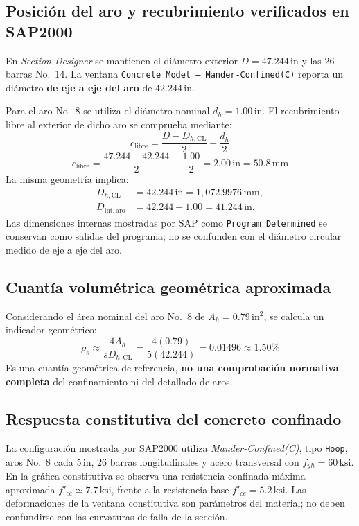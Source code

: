 \documentclass[11pt,a4paper]{article}
\begin{document}
\subsection{Posición del aro y recubrimiento verificados en SAP2000}
En \textit{Section Designer} se mantienen el diámetro exterior
$D=47.244\,\mathrm{in}$ y las $26$ barras No.~14. La ventana
\texttt{Concrete Model -- Mander-Confined(C)} reporta un diámetro
\textbf{de eje a eje del aro} de $42.244\,\mathrm{in}$.

Para el aro No.~8 se utiliza el diámetro nominal $d_h=1.00\,\mathrm{in}$.
El recubrimiento libre al exterior de dicho aro se comprueba mediante:
\begin{equation*}
c_{\mathrm{libre}}=\frac{D-D_{h,\mathrm{CL}}}{2}-\frac{d_h}{2}
\end{equation*}
\begin{equation*}
c_{\mathrm{libre}}=\frac{47.244-42.244}{2}-\frac{1.00}{2}
=\boxed{2.00\,\mathrm{in}=50.8\,\mathrm{mm}}
\end{equation*}
La misma geometría implica:
\begin{align*}
D_{h,\mathrm{CL}} &= 42.244\,\mathrm{in}=1{,}072.9976\,\mathrm{mm},\\
D_{\mathrm{int,aro}} &=42.244-1.00
=\boxed{41.244\,\mathrm{in}}.
\end{align*}
Las dimensiones internas mostradas por SAP como \texttt{Program Determined}
se conservan como salidas del programa; no se confunden con el diámetro
circular medido de eje a eje del aro.

\subsection{Cuantía volumétrica geométrica aproximada}
Considerando el área nominal del aro No.~8 de
$A_h=0.79\,\mathrm{in}^2$, se calcula un indicador geométrico:
\begin{equation*}
\rho_s\approx\frac{4A_h}{sD_{h,\mathrm{CL}}}
=\frac{4(0.79)}{5(42.244)}
=\boxed{0.01496\approx 1.50\%}
\end{equation*}
Es una cuantía geométrica de referencia, \textbf{no una comprobación
normativa completa} del confinamiento ni del detallado de aros.

\subsection{Respuesta constitutiva del concreto confinado}
La configuración mostrada por SAP2000 utiliza
\textit{Mander-Confined(C)}, tipo \texttt{Hoop}, aros No.~8
cada $5\,\mathrm{in}$, $26$ barras longitudinales y acero transversal
con $f_{yh}=60\,\mathrm{ksi}$.
En la gráfica constitutiva se observa una resistencia confinada máxima
aproximada $f'_{cc}\simeq7.7\,\mathrm{ksi}$, frente a la resistencia
base $f'_{ce}=5.2\,\mathrm{ksi}$. Las deformaciones de la ventana
constitutiva son parámetros del material; no deben confundirse con
las curvaturas de falla de la sección.
\end{document}

